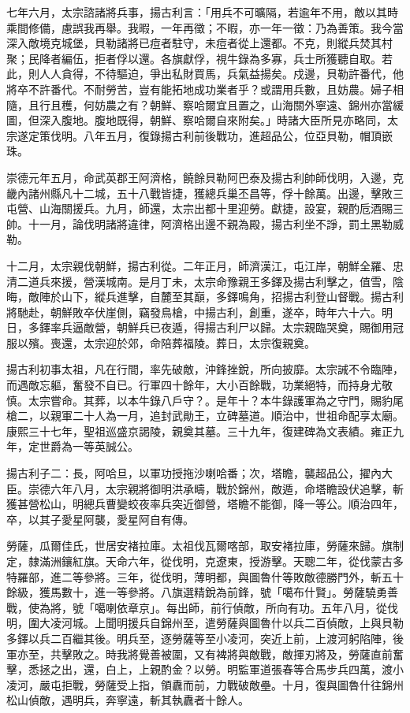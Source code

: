\begin{pinyinscope}
七年六月，太宗諮諸將兵事，揚古利言：「用兵不可曠隔，若逾年不用，敵以其時乘間修備，慮誤我再舉。我暇，一年再徵；不暇，亦一年一徵：乃為善策。我今當深入敵境克城堡，貝勒諸將已痘者駐守，未痘者從上還都。不克，則縱兵焚其村聚；民降者編伍，拒者俘以還。各旗獻俘，視牛錄為多寡，兵士所獲聽自取。若此，則人人貪得，不待驅迫，爭出私財買馬，兵氣益揚矣。戍邊，貝勒許番代，他將卒不許番代。不耐勞苦，豈有能拓地成功業者乎？或謂用兵數，且妨農。婦子相隨，且行且穫，何妨農之有？朝鮮、察哈爾宜且置之，山海關外寧遠、錦州亦當緩圖，但深入腹地。腹地既得，朝鮮、察哈爾自來附矣。」時諸大臣所見亦略同，太宗遂定策伐明。八年五月，復錄揚古利前後戰功，進超品公，位亞貝勒，帽頂嵌珠。

崇德元年五月，命武英郡王阿濟格，饒餘貝勒阿巴泰及揚古利帥師伐明，入邊，克畿內諸州縣凡十二城，五十八戰皆捷，獲總兵巢丕昌等，俘十餘萬。出邊，擊敗三屯營、山海關援兵。九月，師還，太宗出都十里迎勞。獻捷，設宴，親酌卮酒賜三帥。十一月，論伐明諸將違律，阿濟格出邊不親為殿，揚古利坐不諍，罰土黑勒威勒。

十二月，太宗親伐朝鮮，揚古利從。二年正月，師濟漢江，屯江岸，朝鮮全羅、忠清二道兵來援，營漢城南。是月丁未，太宗命豫親王多鐸及揚古利擊之，值雪，陰晦，敵陣於山下，縱兵進擊，自麓至其巔，多鐸鳴角，招揚古利登山督戰。揚古利將馳赴，朝鮮敗卒伏崖側，竊發鳥槍，中揚古利，創重，遂卒，時年六十六。明日，多鐸率兵逼敵營，朝鮮兵已夜遁，得揚古利尸以歸。太宗親臨哭奠，賜御用冠服以殯。喪還，太宗迎於郊，命陪葬福陵。葬日，太宗復親奠。

揚古利初事太祖，凡在行間，率先破敵，沖鋒挫銳，所向披靡。太宗誡不令臨陣，而遇敵忘軀，奮發不自已。行軍四十餘年，大小百餘戰，功業絕特，而持身尤敬慎。太宗嘗命。其葬，以本牛錄八戶守？。是年十？本牛錄護軍為之守門，賜豹尾槍二，以親軍二十人為一月，追封武勛王，立碑墓道。順治中，世祖命配享太廟。康熙三十七年，聖祖巡盛京謁陵，親奠其墓。三十九年，復建碑為文表績。雍正九年，定世爵為一等英誠公。

揚古利子二：長，阿哈旦，以軍功授拖沙喇哈番；次，塔瞻，襲超品公，擢內大臣。崇德六年八月，太宗親將御明洪承疇，戰於錦州，敵遁，命塔瞻設伏追擊，斬獲甚營松山，明總兵曹變蛟夜率兵突近御營，塔瞻不能御，降一等公。順治四年，卒，以其子愛星阿襲，愛星阿自有傳。

勞薩，瓜爾佳氏，世居安褚拉庫。太祖伐瓦爾喀部，取安褚拉庫，勞薩來歸。旗制定，隸滿洲鑲紅旗。天命六年，從伐明，克遼東，授游擊。天聰二年，從伐蒙古多特羅部，進二等參將。三年，從伐明，薄明都，與圖魯什等敗敵德勝門外，斬五十餘級，獲馬數十，進一等參將。八旗選精銳為前鋒，號「噶布什賢」。勞薩驍勇善戰，使為將，號「噶喇依章京」。每出師，前行偵敵，所向有功。五年八月，從伐明，圍大凌河城。上聞明援兵自錦州至，遣勞薩與圖魯什以兵二百偵敵，上與貝勒多鐸以兵二百繼其後。明兵至，逐勞薩等至小凌河，突近上前，上渡河躬陷陣，後軍亦至，共擊敗之。時我將覺善被圍，又有裨將與敵戰，敵揮刃將及，勞薩直前奮擊，悉拯之出，還，白上，上親酌金？以勞。明監軍道張春等合馬步兵四萬，渡小凌河，嚴屯拒戰，勞薩受上指，領纛而前，力戰破敵壘。十月，復與圖魯什往錦州松山偵敵，遇明兵，奔寧遠，斬其執纛者十餘人。


\end{pinyinscope}

